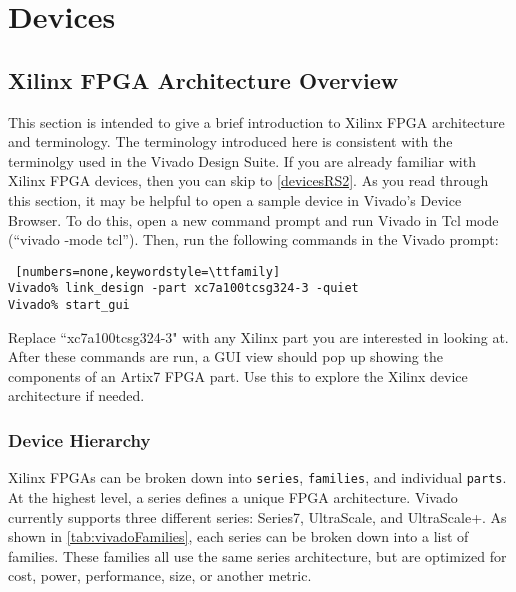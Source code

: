\newpage
\section{Devices}
\graphicspath{{./techReportFigures/sec4_devices/}}

\subsection{Xilinx FPGA Architecture Overview} \label{fpgaArch}
This section is intended to give a brief introduction to Xilinx FPGA
architecture and terminology. The terminology introduced here is consistent
with the terminolgy used in the Vivado Design Suite. If you are already familiar
with Xilinx FPGA devices, then you can skip to \autoref{devicesRS2}. 
As you read through this section, it may be helpful to open a sample device in Vivado's
Device Browser. To do this, open a new command prompt and run Vivado in Tcl mode
(``vivado -mode tcl''). Then, run the following commands in the Vivado prompt:

\begin{lstlisting} [numbers=none,keywordstyle=\ttfamily]
Vivado% link_design -part xc7a100tcsg324-3 -quiet
Vivado% start_gui
\end{lstlisting}

\noindent
Replace ``xc7a100tcsg324-3" with any Xilinx part you are interested in looking
at. After these commands are run, a GUI view should pop up showing the
components of an Artix7 FPGA part. Use this to explore the Xilinx device 
architecture if needed.

\subsubsection{Device Hierarchy} \label{sec:deviceHierarchy}
Xilinx FPGAs can be broken down into \texttt{series},
\texttt{families}, and individual \texttt{parts}. At the highest level, a series
defines a unique FPGA architecture. Vivado currently supports three different
series: Series7, UltraScale, and UltraScale+. As shown in
\autoref{tab:vivadoFamilies}, each series can be broken down into a list of
families. These families all use the same series architecture, but are
optimized for cost, power, performance, size, or another metric.


